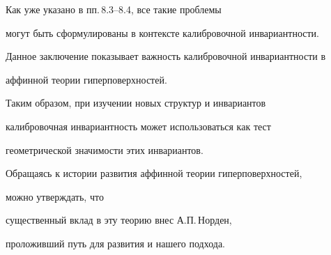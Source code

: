 Как уже указано в пп.\,8.3--8.4, все такие проблемы

могут быть сформулированы в контексте калибровочной инвариантности.

\medskip



Данное заключение показывает важность калибровочной инвариантности в

аффинной теории гиперповерхностей.

Таким образом, при изучении новых структур и инвариантов

калибровочная инвариантность может использоваться как тест

геометрической значимости этих инвариантов.

Обращаясь к истории развития аффинной теории гиперповерхностей,

можно утверждать, что

существенный вклад в эту теорию внес А.П.\,Норден,

проложивший путь для развития и нашего подхода.









